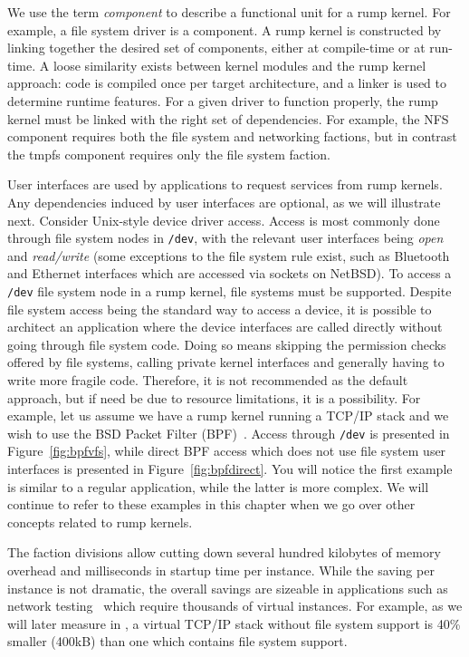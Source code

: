 We use the term \textit{component} to describe a functional unit for a
rump kernel.  For example, a file system driver is a component.  A rump
kernel is constructed by linking together the desired set of components,
either at compile-time or at run-time.  A loose similarity exists between
kernel modules and the rump kernel approach: code is compiled once per
target architecture, and a linker is used to determine runtime features.
For a given driver to function properly, the rump kernel must be linked
with the right set of dependencies.  For example, the NFS component requires
both the file system and networking factions, but in contrast the tmpfs
component requires only the file system faction.

User interfaces are used by applications to request services from
rump kernels.  Any dependencies induced by user interfaces
are optional, as we will illustrate next.  Consider Unix-style
device driver access.  Access is most commonly done through file
system nodes in \texttt{/dev}, with the relevant user interfaces
being \textit{open} and \textit{read/write} (some exceptions to the
file system rule exist, such as Bluetooth and Ethernet interfaces
which are accessed via sockets on NetBSD).  To access a
\texttt{/dev} file system node in a rump kernel, file systems must be
supported.  Despite file system access being the standard way to access
a device, it is possible to architect an application
where the device interfaces are called directly without going
through file system code.  Doing so means skipping the permission
checks offered by file systems, calling private kernel interfaces and
generally having to write more fragile code.  Therefore, it is not
recommended as the default approach, but if need be due to resource
limitations, it is a possibility.  For example, let us assume we
have a rump kernel running a TCP/IP stack and we wish to use the BSD
Packet Filter (BPF)~\cite{mccanne:bpf}.  Access through
\texttt{/dev} is presented in Figure~\ref{fig:bpfvfs}, while direct
BPF access which does not use file system user interfaces is
presented in Figure~\ref{fig:bpfdirect}.  You will notice the first
example is similar to a regular application, while the latter is
more complex.  We will continue to refer to these examples in this
chapter when we go over other concepts related to rump kernels.

The faction divisions allow cutting down several hundred kilobytes
of memory overhead and milliseconds in startup time per instance.
While the saving per instance is not dramatic, the overall savings
are sizeable in applications such as network testing~\cite{hibler:emulab}
which require thousands of virtual instances.  For example, as we
will later measure in , a virtual TCP/IP stack
without file system support is 40\% smaller (400kB) than
one which contains file system support.

